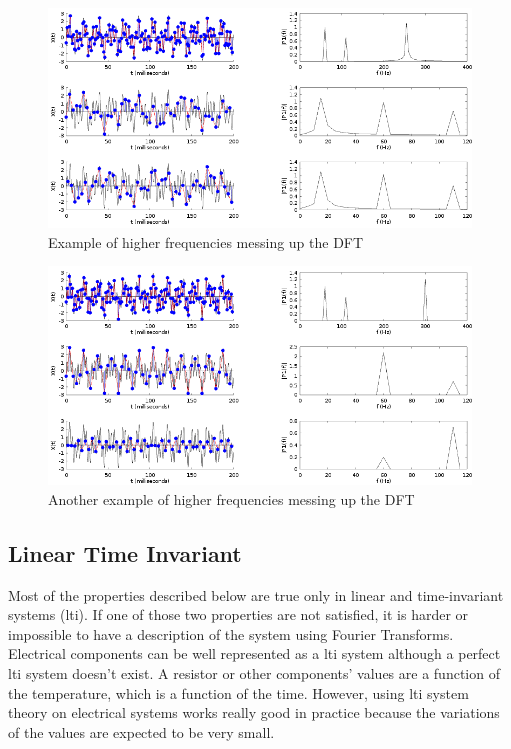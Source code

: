 \begin{figure}
    \centering
    \includegraphics[width=\textwidth]{img/nyquist-shannon.png}
    \caption{Example of higher frequencies messing up the DFT}
    \label{fig:nyquist-shannon}
\end{figure}

\begin{figure}
    \centering
    \includegraphics[width=\textwidth]{img/nyquist-shannon-2.png}
    \caption{Another example of higher frequencies messing up the DFT}
    \label{fig:nyquist-shannon-2}
\end{figure}


\subsection{Linear Time Invariant}
Most of the properties described below are true only in linear and time-invariant systems (\acrshort{lti}). If one of those two properties are not satisfied, it is harder or impossible to have a description of the system using Fourier Transforms. Electrical components can be well represented as a \acrshort{lti} system although a perfect \acrshort{lti} system doesn't exist. A resistor or other components' values are a function of the temperature, which is a function of the time. However, using \acrshort{lti} system theory on electrical systems works really good in practice because the variations of the values are expected to be very small.

